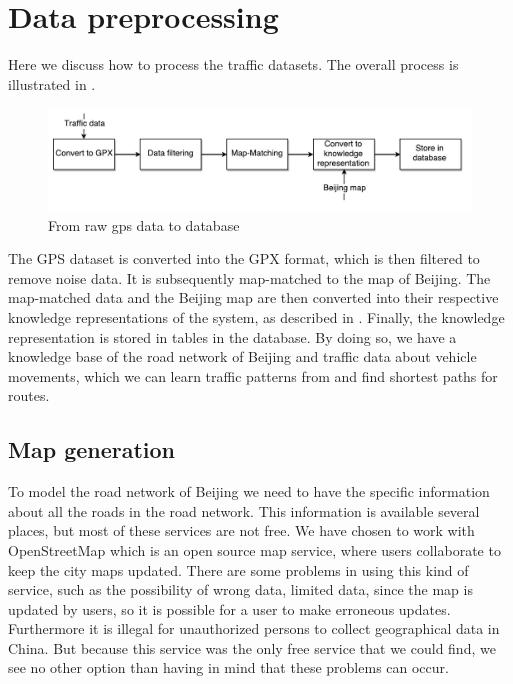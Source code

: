 \section{Data preprocessing}
Here we discuss how to process the traffic datasets. The overall process is illustrated in .

\begin{figure}[h!]
  \centering
    \includegraphics[width=1\textwidth]{figures/data_preprocessing.pdf}
    \caption{From raw gps data to database}
    \label{fig:data-processing}
\end{figure}

The GPS dataset is converted into the GPX format, which is then filtered to remove noise data. It is subsequently map-matched to the map of Beijing. The map-matched data and the Beijing map are then converted into their respective knowledge representations of the system, as described in . Finally, the knowledge representation is stored in tables in the database.
By doing so, we have a knowledge base of the road network of Beijing and traffic data about vehicle movements, which we can learn traffic patterns from and find shortest paths for routes.

\subsection{Map generation}\label{sec:mapgeneration}
To model the road network of Beijing we need to have the specific information about all the roads in the road network. This information is available several places, but most of these services are not free. We have chosen to work with OpenStreetMap which is an open source map service, where users collaborate to keep the city maps updated. There are some problems in using this kind of service, such as the possibility of wrong data, limited data, since the map is updated by users, so it is possible for a user to make erroneous updates. Furthermore it is illegal for unauthorized persons to collect geographical data in China\cite{chinamapillegal}. But because this service was the only free service that we could find, we see no other option than having in mind that these problems can occur.

